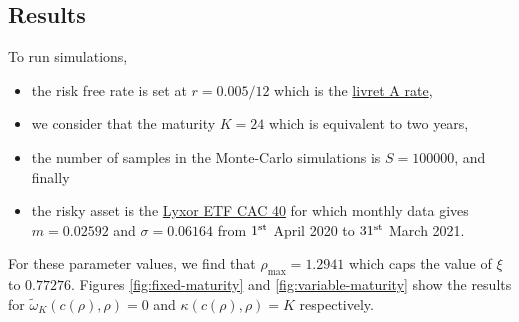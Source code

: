 \documentclass{article}
\begin{document}
\subsection{Results}

To run simulations, 
\begin{itemize}
\item the risk free rate is set at $r = 0.005/12$ which is the \href{https://www.capital.fr/votre-argent/livret-a-ldds-lep-cel-pee-les-nouveaux-taux-de-votre-epargne-reglementee-au-1er-fevrier-2020-1361121#:~:text=Livret%20A%20%3A%20taux%20%C3%A0%200%2C5%25&text=Pour%20une%20personne%20l'ayant,de%20115%20euros%20par%20an.}{\color{awesomePurple}livret A rate},
\item we consider that the maturity $K = 24$ which is equivalent to two years,
\item the number of samples in the Monte-Carlo simulations is $S = 100000$, and finally
\item the risky asset is the \href{https://www.abcbourse.com/download/valeur/CACp}{\color{awesomePurple}Lyxor ETF CAC 40} for which monthly data gives $m = 0.02592$ and $\sigma = 0.06164$ from $1^\textnormal{st}$ April 2020 to $31^\textnormal{st}$ March 2021.
\end{itemize}

For these parameter values, we find that 
$
\rho_{\max} = 1.2941
$ which caps the value of $\xi$ to $0.77276$. Figures \ref{fig:fixed-maturity} and \ref{fig:variable-maturity} show the results for $\tilde\omega_K(c(\rho), \rho) = 0$ and $\kappa(c(\rho), \rho)= K$ respectively. 
\end{document}
